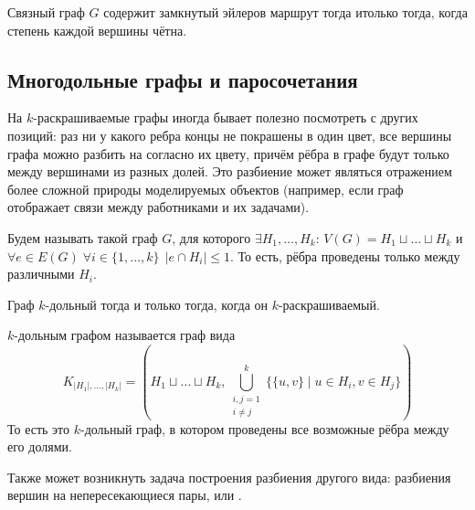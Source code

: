 \begin{theorem}
    Связный граф $ G $ содержит замкнутый эйлеров маршрут тогда итолько тогда, когда степень каждой вершины чётна.
\end{theorem}



\subsection{Многодольные графы и паросочетания}
\label{subsec:graphs:multipartite_matching}

На $ k $-раскрашиваемые графы иногда бывает полезно посмотреть с других позиций:
раз ни у какого ребра концы не покрашены в один цвет, все вершины графа можно разбить на  согласно их цвету,
причём рёбра в графе будут только между вершинами из разных долей.
Это разбиение может являться отражением более сложной природы моделируемых объектов
(например, если граф отображает связи между работниками и их задачами).

\begin{definition}
    Будем называть  такой граф $ G $, для которого $ \exists H_1, \ldots, H_k $:
    $ V(G) = H_1 \sqcup \ldots \sqcup H_k $ и $ \forall e \in E(G) \; \forall i \in \{1, \ldots, k\} \;\, | e \cap H_i | \leqslant 1 $.
    То есть, рёбра проведены только между различными  $ H_i $.
\end{definition}

\begin{remark}
    Граф $ k $-дольный тогда и только тогда, когда он $ k $-раскрашиваемый.
\end{remark}

\begin{definition}
     $ k $-дольным графом называется граф вида
    \[
        K_{|H_1|, \ldots, |H_k|} = \left( H_1 \sqcup \ldots \sqcup H_k, \bigcup_{\substack{i,j = 1 \\ i \neq j}}^k \big\{ \{u, v\} \mid u \in H_i, v \in H_j \big\} \right)
    \]
    То есть это $ k $-дольный граф, в котором проведены все возможные рёбра между его долями.
\end{definition}


Также может возникнуть задача построения разбиения другого вида: разбиения вершин на непересекающиеся пары, или .

